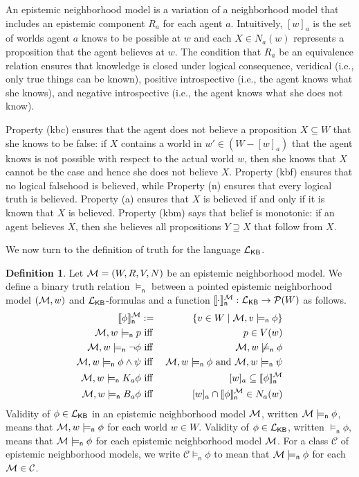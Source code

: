 \documentclass[12pt]{article}
\newcommand{\XXXcomment}[1]{}
\newcommand{\XXXcomment}[1]{\marginpar{\color{blue}{\footnotesize #1}}}
\theoremstyle{definition}
\newtheorem{definition}[theorem]{Definition}
\newcommand{\pow}{{\cal P}}    %
\newcommand{\M}{{\cal M}}      %
\newcommand{\Lang}{{\cal L}}   %
\newcommand{\KB}{{\mathsf{KB}}}                        %
\newcommand{\modelsn}{\models_{\mathsf{n}}}                  %
\newcommand{\semn}[1]{\llbracket{#1}\rrbracket_{\mathsf{n}}} %
\begin{document}
An epistemic neighborhood model is a variation of a neighborhood model that
includes an epistemic component $R_a$ for each agent $a$.
Intuitively, $[w]_a$ is the set of worlds agent $a$ knows to be
possible at $w$ and each $X\in N_a(w)$ represents a proposition that
the agent believes at $w$.  The condition that $R_a$ be an equivalence
relation ensures that knowledge is closed under logical consequence,
veridical (i.e., only true things can be known), positive
introspective (i.e., the agent knows what she knows), and negative
introspective (i.e., the agent knows what she does not know).

Property (kbc) ensures that the agent does not believe a proposition
$X\subseteq W$ that she knows to be false: if $X$ contains a world in
$w'\in(W-[w]_a)$ that the agent knows is not possible with respect to
the actual world $w$, then she knows that $X$ cannot be the case and
hence she does not believe $X$.  Property (kbf) ensures that no
logical falsehood is believed, while Property (n) ensures that every
logical truth is believed.  Property (a) ensures that $X$ is believed
if and only if it is known that $X$ is believed. Property (kbm) says
that belief is monotonic: if an agent believes $X$, then she believes
all propositions $Y\supseteq X$ that follow from $X$.

\XXXcomment{BR: changed informal description of (a) (in paragraph just
  above) to be an iff (as opposed to an implication).  I think this is
  right.  Agree?}

We now turn to the definition of truth for the language $\Lang_\KB$.

\begin{definition} 
  Let $\M = (W,R,V,N)$ be an epistemic neighborhood model.  We define
  a binary truth relation $\modelsn$ between a pointed epistemic
  neighborhood model $(\M,w)$ and $\Lang_\KB$-formulas and a function
  $\semn{\cdot}^\M:\Lang_\KB\to \pow(W)$ as follows.
  \begin{eqnarray*} 
    \semn{\phi}^\M & := & \{v\in W\mid \M,v\modelsn\phi\}
    \\
    \M, w \modelsn p & \text{ iff } & p \in V(w) 
    \\
    \M, w \modelsn \neg \phi & \text{ iff } & \M, w \not\modelsn \phi 
    \\
    \M, w \modelsn \phi\land\psi  & \text{ iff } 
    & \M, w \modelsn \phi \text{ and } \M, w \modelsn \psi
    \\
    \M, w \modelsn K_a \phi  & \text{ iff } & 
    [w]_a\subseteq\semn{\phi}^\M
    \\
    \M, w \modelsn B_a \phi  & \text{ iff } &
    [w]_a\cap \semn{\phi}^\M \in N_a(w)
  \end{eqnarray*}
  Validity of $\phi\in\Lang_\KB$ in an epistemic neighborhood model
  $\M$, written $\M\modelsn\phi$, means that $\M,w\modelsn\phi$ for
  each world $w\in W$.  Validity of $\phi\in\Lang_\KB$, written
  $\modelsn\phi$, means that $\M\modelsn\phi$ for each epistemic
  neighborhood model $\M$.  For a class $\mathcal{C}$ of epistemic
  neighborhood models, we write $\mathcal{C}\modelsn\phi$ to mean that
  $\M\modelsn\phi$ for each $\M\in\mathcal{C}$.
\end{definition}
\end{document}
